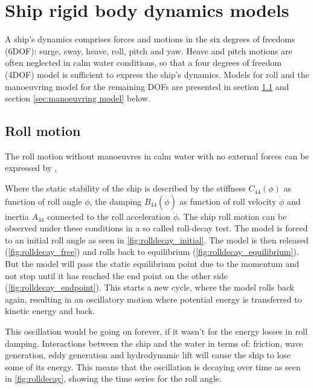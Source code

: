 \chapter{Ship rigid body dynamics models}
\label{ch:models}

A ship's dynamics comprises forces and motions in the six degrees of freedoms (6DOF): surge, sway, heave, roll, pitch and yaw. Heave and pitch motions are often neglected in calm water conditions, so that a four degrees of freedom (4DOF) model is sufficient to express the ship's dynamics. Models for roll and the manoeuvring model for the remaining DOFs are presented in section \ref{sec:roll} and section \ref{sec:manoeuvring model} below. 

\section{Roll motion} \label{sec:roll}
The roll motion without manoeuvres in calm water with no external forces can be expressed by  \cite{himeno_prediction_1981},

\noindent Where the static stability of the ship is described by the stiffness $C_{44}(\phi)$ as function of roll angle $\phi$, the damping $B_{44}(\dot{\phi})$ as function of roll velocity $\dot{\phi}$ and inertia $A_{44}$ connected to the roll acceleration $\ddot{\phi}$. The ship roll motion can be observed under these conditions in a so called roll-decay test. The model is forced to an initial roll angle as seen in \autoref{fig:rolldecay_initial}. The model is then released (\autoref{fig:rolldecay_free}) and rolls back to equilibrium (\autoref{fig:rolldecay_equilibrium}). But the model will pass the static equilibrium point due to the momentum and not stop until it has reached the end point on the other side (\autoref{fig:rolldecay_endpoint}). This starts a new cycle, where the model rolls back again, resulting in an oscillatory motion where potential energy is transferred to kinetic energy and back.

\noindent This oscillation would be going on forever, if it wasn't for the energy losses in roll damping. Interactions between the ship and the water in terms of: friction, wave generation, eddy generation and hydrodynamic lift will cause the ship to lose some of its energy. This means that the oscillation is decaying over time as seen in \autoref{fig:rolldecay}, showing the time series for the roll angle.

